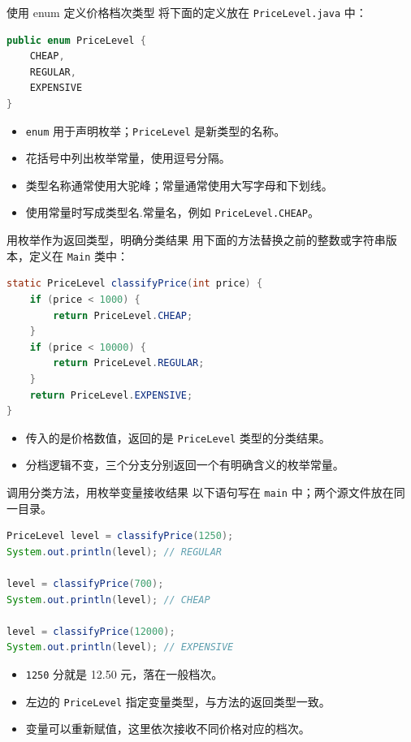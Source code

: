 \documentclass[aspectratio=169]{beamer}
\begin{document}
\begin{frame}[fragile]{使用 enum 定义价格档次类型}
  将下面的定义放在 \texttt{PriceLevel.java} 中：
  \begin{lstlisting}[language=Java]
public enum PriceLevel {
    CHEAP,
    REGULAR,
    EXPENSIVE
}
  \end{lstlisting}
  \begin{itemize}
    \item \texttt{enum} 用于声明枚举；\texttt{PriceLevel} 是新类型的名称。
    \item 花括号中列出枚举常量，使用逗号分隔。
    \item 类型名称通常使用大驼峰；常量通常使用大写字母和下划线。
    \item 使用常量时写成\alert{类型名.常量名}，例如 \texttt{PriceLevel.CHEAP}。
  \end{itemize}
\end{frame}

\begin{frame}[fragile]{用枚举作为返回类型，明确分类结果}
  用下面的方法替换之前的整数或字符串版本，定义在 \texttt{Main} 类中：
  \begin{lstlisting}[language=Java]
static PriceLevel classifyPrice(int price) {
    if (price < 1000) {
        return PriceLevel.CHEAP;
    }
    if (price < 10000) {
        return PriceLevel.REGULAR;
    }
    return PriceLevel.EXPENSIVE;
}
  \end{lstlisting}
  \begin{itemize}
    \item 传入的是价格数值，返回的是 \texttt{PriceLevel} 类型的分类结果。
    \item 分档逻辑不变，三个分支分别返回一个有明确含义的枚举常量。
  \end{itemize}
\end{frame}

\begin{frame}[fragile]{调用分类方法，用枚举变量接收结果}
  以下语句写在 \texttt{main} 中；两个源文件放在同一目录。
  \begin{lstlisting}[language=Java]
PriceLevel level = classifyPrice(1250);
System.out.println(level); // REGULAR

level = classifyPrice(700);
System.out.println(level); // CHEAP

level = classifyPrice(12000);
System.out.println(level); // EXPENSIVE
  \end{lstlisting}
  \begin{itemize}
    \item \texttt{1250} 分就是 12.50 元，落在一般档次。
    \item 左边的 \texttt{PriceLevel} 指定变量类型，与方法的返回类型一致。
    \item 变量可以重新赋值，这里依次接收不同价格对应的档次。
  \end{itemize}
\end{frame}
\end{document}
